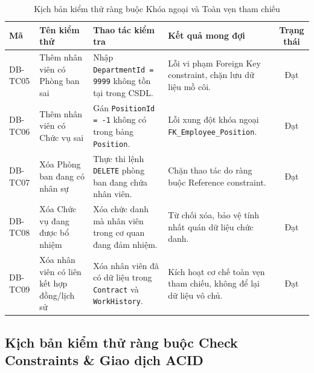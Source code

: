 \documentclass[12pt,a4paper]{report}
\begin{document}
\begin{table}[htbp]
\centering
\small
\begin{tabularx}{\textwidth}{|l|p{3.5cm}|p{3.8cm}|p{3.8cm}|c|}
\hline
\textbf{Mã} & \textbf{Tên kiểm thử} & \textbf{Thao tác kiểm tra} & \textbf{Kết quả mong đợi} & \textbf{Trạng thái} \\ \hline
DB-TC05 & Thêm nhân viên có Phòng ban sai & Nhập \texttt{DepartmentId = 9999} không tồn tại trong CSDL. & Lỗi vi phạm Foreign Key constraint, chặn lưu dữ liệu mồ côi. & Đạt \\ \hline
DB-TC06 & Thêm nhân viên có Chức vụ sai & Gán \texttt{PositionId = -1} không có trong bảng \texttt{Position}. & Lỗi xung đột khóa ngoại \texttt{FK\_Employee\_Position}. & Đạt \\ \hline
DB-TC07 & Xóa Phòng ban đang có nhân sự & Thực thi lệnh \texttt{DELETE} phòng ban đang chứa nhân viên. & Chặn thao tác do ràng buộc Reference constraint. & Đạt \\ \hline
DB-TC08 & Xóa Chức vụ đang được bổ nhiệm & Xóa chức danh mà nhân viên trong cơ quan đang đảm nhiệm. & Từ chối xóa, bảo vệ tính nhất quán dữ liệu chức danh. & Đạt \\ \hline
DB-TC09 & Xóa nhân viên có liên kết hợp đồng/lịch sử & Xóa nhân viên đã có dữ liệu trong \texttt{Contract} và \texttt{WorkHistory}. & Kích hoạt cơ chế toàn vẹn tham chiếu, không để lại dữ liệu vô chủ. & Đạt \\ \hline
\end{tabularx}
\caption{Kịch bản kiểm thử ràng buộc Khóa ngoại và Toàn vẹn tham chiếu}
\end{table}

\subsection{Kịch bản kiểm thử ràng buộc Check Constraints \& Giao dịch ACID}
\end{document}
